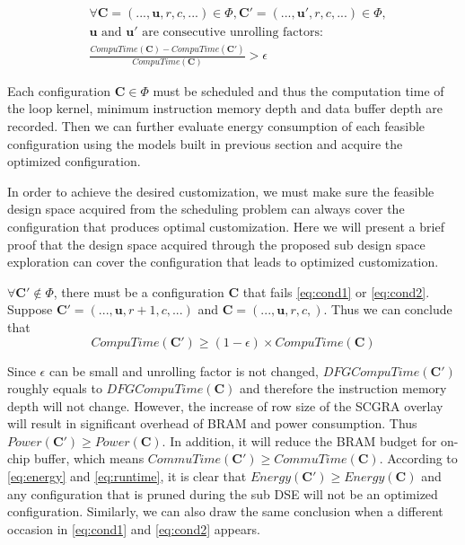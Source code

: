 \begin{equation} \label{eq:cond2}
    \begin{split}
        &\forall \bm{C}=(...,\bm{u},r,c,...) \in \Phi, \bm{C'}=(...,\bm{u'},r,c,...) \in \Phi,\\ 
        &\bm{u} \text{ and } \bm{u'} \text{ are consecutive unrolling factors}: \\
        &\frac{CompuTime(\bm{C})-CompuTime(\bm{C'})}{CompuTime(\bm{C})} > \epsilon
    \end{split}
\end{equation}

Each configuration $\bm{C} \in \Phi$ must be scheduled and 
thus the computation time of the loop kernel, minimum instruction 
memory depth and data buffer depth are recorded. Then we can further evaluate 
energy consumption of each feasible configuration using the models built in 
previous section and acquire the optimized configuration.

In order to achieve the desired customization, we must make sure the 
feasible design space acquired from the scheduling problem can always 
cover the configuration that produces optimal customization. Here we 
will present a brief proof that the design space acquired through the 
proposed sub design space exploration can cover the configuration that 
leads to optimized customization.

$\forall \bm{C'} \notin \Phi$, there must be a configuration $\bm{C}$ that fails 
\eqref{eq:cond1} or \eqref{eq:cond2}. Suppose $\bm{C'}=(...,\bm{u},r+1,c,...)$ 
and $\bm{C}=(...,\bm{u},r,c,)$. Thus we can conclude that 
\begin{equation}
    CompuTime(\bm{C'}) \geq (1-\epsilon) \times CompuTime(\bm{C})
\end{equation}

Since $\epsilon$ can be small and unrolling factor is not changed, $DFGCompuTime(\bm{C'})$ 
roughly equals to $DFGCompuTime(\bm{C})$ and therefore the instruction memory depth 
will not change. However, the increase of row size of the SCGRA overlay will result in 
significant overhead of BRAM and power consumption. Thus $Power(\bm{C'}) 
\geq Power(\bm{C})$. In addition, it will reduce the BRAM budget 
for on-chip buffer, which means 
$CommuTime(\bm{C'}) \geq CommuTime(\bm{C})$. According to \eqref{eq:energy} 
and \eqref{eq:runtime}, it is clear that $Energy(\bm{C'}) \geq Energy(\bm{C})$ and 
any configuration that is pruned during the sub DSE will not be an optimized 
configuration. Similarly, we can also draw the same conclusion when a different 
occasion in \eqref{eq:cond1} and \eqref{eq:cond2} appears.

